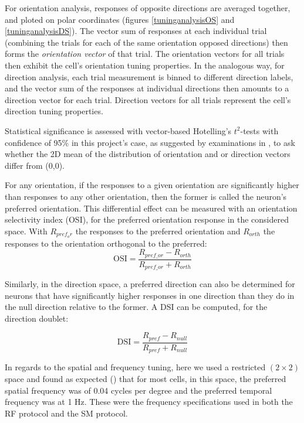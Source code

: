 For orientation analysis, responses of opposite directions are averaged together, and ploted on polar coordinates (figures \ref{tuninganalysisOS} and \ref{tuninganalysisDS}). The vector sum of responses at each individual trial (combining the trials for each of the same orientation opposed directions) then forms the \textit{orientation vector} of that trial. The orientation vectors for all trials then exhibit the cell's orientation tuning properties.
In the analogous way, for direction analysis, each trial measurement is binned to different direction labels, and the vector sum of the responses at individual directions then amounts to a direction vector for each trial. Direction vectors for all trials represent the cell's direction tuning properties.

Statistical significance is assessed with vector-based Hotelling's $t^2$-tests with confidence of 95\% in this project's case, as suggested by examinations in \cite{Mazurek2014}, to ask whether the 2D mean of the distribution of orientation and or direction vectors differ from (0,0).
 
 For any orientation, if the responses to a given orientation are significantly higher than responses to any other orientation, then the former is called the neuron's preferred orientation. This differential effect can be measured with an orientation selectivity index (OSI), for the preferred orientation response in the considered space. With  $R_{pref_or}$ the responses to the preferred orientation and $R_{orth}$ the responses to the orientation orthogonal to the preferred:
\begin{equation}
\text{OSI}= \dfrac{R_{pref \_or} - R_{orth}}{R_{pref \_or} + R_{orth}}
\end{equation}

Similarly, in the direction space, a preferred direction can also be determined for neurons that have significantly higher responses in one direction than they do in the null direction relative to the former. A DSI can be computed, for the direction doublet:

\begin{equation}
\text{DSI}=\dfrac{R_{pref} - R_{null}}{R_{pref} + R_{null}}
\end{equation}

In regards to the spatial and frequency tuning, here we used a restricted $(2 \times 2)$ space and found as expected (\cite{Whichpapershowsthis?}) that for most cells, in this space, the preferred spatial frequency was of 0.04 cycles per degree and the preferred temporal frequency was at 1 Hz. These were the frequency specifications used in both the RF protocol and the SM protocol.

